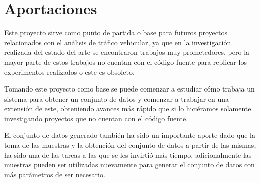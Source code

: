 \section{Aportaciones}

Este proyecto sirve como punto de partida o base para futuros proyectos relacionados con el análisis de tráfico vehicular, ya que en la investigación realizada del estado del arte se encontraron trabajos muy prometedores, pero la mayor parte de estos trabajos no cuentan con el código fuente para replicar los experimentos realizados o este es obsoleto.

Tomando este proyecto como base se puede comenzar a estudiar cómo trabaja un sistema para obtener un conjunto de datos y comenzar a trabajar en una extensión de este, obteniendo avances más rápido que si lo hiciéramos solamente investigando proyectos que no cuentan con el código fuente.

El conjunto de datos generado también ha sido un importante aporte dado que la toma de las muestras y la obtención del conjunto de datos a partir de las mismas, ha sido una de las tareas a las que se les invirtió más tiempo, adicionalmente las muestras pueden ser utilizadas nuevamente para generar el conjunto de datos con más parámetros de ser necesario.
